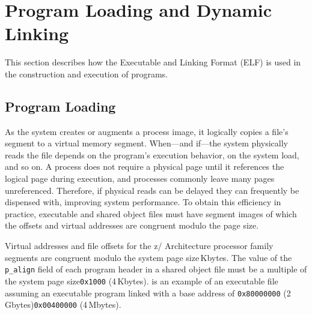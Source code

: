 \documentclass[english,11pt,twoside,toc=bib,toc=idx]{scrreprt}
\newcommand{\ARCH}{z/\kern-1pt Ar\-chi\-tec\-ture}
\newcommand{\ARCH}{ESA/390}
\begin{document}
\chapter{Program Loading and Dynamic Linking}
\label{chprogload}
This section describes how the Executable and Linking Format (ELF) is
used in the construction and execution of programs.

\section{Program Loading}
As the system creates or augments a process image, it logically copies
a file's segment to a virtual memory segment.  When---and if---the
system physically reads the file depends on the program's execution
behavior, on the system load, and so on.  A process does not require a
physical page until it references the logical page during execution,
and processes commonly leave many pages unreferenced.  Therefore, if
physical reads can be delayed they can frequently be dispensed with,
improving system performance.  To obtain this efficiency in practice,
executable and shared object files must have segment images of which
the offsets and virtual addresses are congruent modulo the page size.

Virtual addresses and file offsets for the \ARCH{} processor family
segments are congruent modulo {\ifzseries the system page size$\,$Kbytes\fi}.  The value of the \texttt{p\_align} field of each
program header in a shared object file must be {\ifzseries a multiple
  of the system page size\else \texttt{0x1000} (4$\,$Kbytes)\fi}.
 is an example of an executable file assuming an
executable program linked with a base address of {\ifzseries
  \texttt{0x80000000} (2$\,$Gbytes)\else \texttt{0x00400000}
  (4$\,$Mbytes)\fi}.
\end{document}
